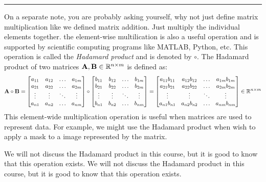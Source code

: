 \begin{boxedstuff}
    \vspace{4mm}
    \hrule
    \vspace{2mm}

    On a separate note, you are probably asking yourself, why not just define matrix multiplication like we defined matrix addition. Just multiply the individual elements together. the element-wise multilication is also a useful operation and is supported by scientific computing programs like MATLAB, Python, etc. This operation is called the \textit{Hadamard product} and is denoted by $\circ$. The Hadamard product of two matrices $\mathbf{A}, \mathbf{B} \in \mathbb{R}^{n \times m}$ is defined as:
    \begin{equation}
        \mf{A} \circ \mf{B} = \bmxc a_{11} & a_{12} & \ldots & a_{1m} \\ a_{21} & a_{22} & \ldots & a_{2m} \\ \vdots & \vdots & \ddots & \vdots \\ a_{n1} & a_{n2} & \ldots & a_{nm} \emx \circ \bmxc b_{11} & b_{12} & \ldots & b_{1m} \\ b_{21} & b_{22} & \ldots & b_{2m} \\ \vdots & \vdots & \ddots & \vdots \\ b_{n1} & b_{n2} & \ldots & b_{nm} \emx = \bmxc a_{11}b_{11} & a_{12}b_{12} & \ldots & a_{1m}b_{1m} \\ a_{21}b_{21} & a_{22}b_{22} & \ldots & a_{2m}b_{2m} \\ \vdots & \vdots & \ddots & \vdots \\ a_{n1}b_{n1} & a_{n2}b_{n2} & \ldots & a_{nm}b_{nm} \emx \in \mb{R}^{n \times m}
        \label{eq:ch02-mat-hadamard}
    \end{equation}
    This element-wide multiplication operation is useful when matrices are used to represent data. For example, we might use the Hadamard product when wish to apply a mask to a image represented by the matrix. 
    
    We will not discuss the Hadamard product in this course, but it is good to know that this operation exists.
    We will not discuss the Hadamard product in this course, but it is good to know that this operation exists.
\end{boxedstuff}


